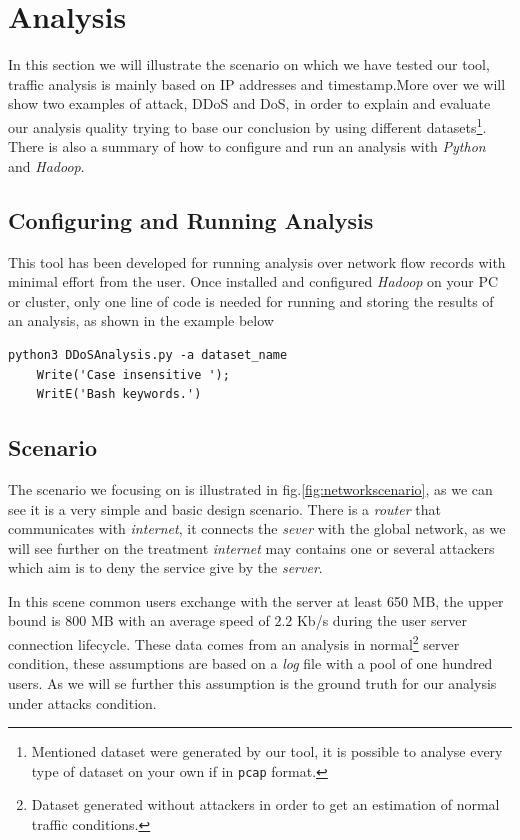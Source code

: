 \section{Analysis}
In this section we will illustrate the scenario on which we have tested our tool, traffic analysis is mainly based on IP addresses and timestamp\cite{ddos_forensics}.More over we will show two examples of attack, DDoS and DoS, in order to explain and evaluate our analysis quality trying to base our conclusion by using different datasets\footnote{Mentioned dataset were generated by our tool, it is possible to analyse every type of dataset on your own if in \texttt{pcap} format.}. There is also a summary of how to configure and run an analysis with \textit{Python} and \textit{Hadoop}.

\subsection{Configuring and Running Analysis}
This tool has been developed for running analysis over network flow records with minimal effort from the user. Once installed and configured \textit{Hadoop} on your PC or cluster, only one line of code is needed for running and storing the results of an analysis, as shown in the example below

\begin{lstlisting}[firstline=1, lastline=1]
   python3 DDoSAnalysis.py -a dataset_name
	Write('Case insensitive '); 
	WritE('Bash keywords.')
\end{lstlisting}

\subsection{Scenario} 
The scenario we focusing on is illustrated in fig.\ref{fig:networkscenario}, as we can see it is a very simple and basic design scenario. There is a \textit{router} that communicates with \textit{internet},  it connects the \textit{sever} with the global network, as we will see further on the treatment \textit{internet} may contains one or several attackers which aim is to deny the service give by the \textit{server}. 

In this scene common users exchange with the server at least 650 MB, the upper bound is $800$ MB with an average speed of $2.2$ Kb/s during the user server connection lifecycle. These data comes from an analysis in normal\footnote{Dataset generated without attackers in order to get an estimation of normal traffic conditions.} server condition, these assumptions are based on a \textit{log} file with a pool of one hundred users. As we will se further this assumption is the ground truth for our analysis under attacks condition.

